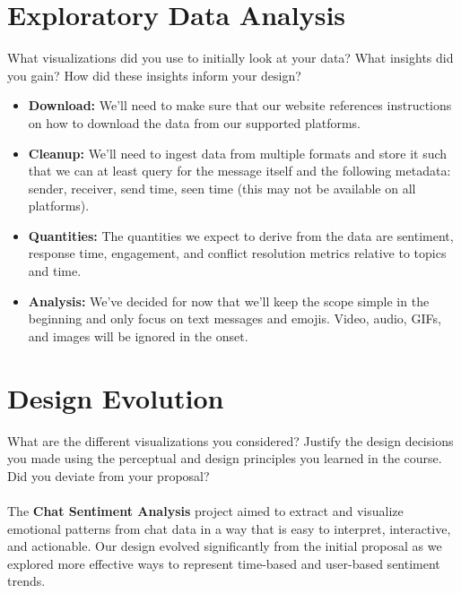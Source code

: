 \documentclass{article}\usepackage{graphicx}
\begin{document}
\section*{Exploratory Data Analysis}
What visualizations did you use to initially look at your data? What insights did you gain? How did these insights inform your design?
\begin{itemize}
    \item \textbf{Download:} We'll need to make sure that our website references instructions on how to download the data from our supported platforms.
    \item \textbf{Cleanup:} We'll need to ingest data from multiple formats and store it such that we can at least query for the message itself and the following metadata: sender, receiver, send time, seen time (this may not be available on all platforms).
    \item \textbf{Quantities:} The quantities we expect to derive from the data are sentiment, response time, engagement, and conflict resolution metrics relative to topics and time.
    \item \textbf{Analysis:} We've decided for now that we'll keep the scope simple in the beginning and only focus on text messages and emojis. Video, audio, GIFs, and images will be ignored in the onset.
\end{itemize}

\section*{Design Evolution}

What are the different visualizations you considered? Justify the design decisions you made using the perceptual and design principles you learned in the course. Did you deviate from your proposal?
\\
\\The \textbf{Chat Sentiment Analysis} project aimed to extract and visualize emotional patterns from chat data in a way that is easy to interpret, interactive, and actionable. Our design evolved significantly from the initial proposal as we explored more effective ways to represent time-based and user-based sentiment trends.
\end{document}
